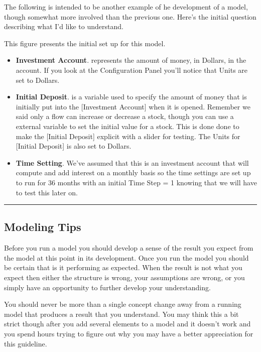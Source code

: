 \documentclass[]{memoir}
\begin{document}
The following is intended to be another example of he development of a
model, though somewhat more involved than the previous one. Here's the
initial question describing what I'd like to understand.

This figure presents the initial set up for this model.

\begin{itemize}
\itemsep1pt\parskip0pt
\item
  \textbf{Investment Account}. represents the amount of money, in
  Dollars, in the account. If you look at the Configuration Panel you'll
  notice that Units are set to Dollars.
\item
  \textbf{Initial Deposit}. is a variable used to specify the amount of
  money that is initially put into the {[}Investment Account{]} when it
  is opened. Remember we said only a flow can increase or decrease a
  stock, though you can use a external variable to set the initial value
  for a stock. This is done done to make the {[}Initial Deposit{]}
  explicit with a slider for testing. The Units for {[}Initial
  Deposit{]} is also set to Dollars.
\item
  \textbf{Time Setting}. We've assumed that this is an investment
  account that will compute and add interest on a monthly basis so the
  time settings are set up to run for 36 months with an initial Time
  Step = 1 knowing that we will have to test this later on.
\end{itemize}

\begin{center}\rule{3in}{0.4pt}\end{center}

\subsection{Modeling Tips}

Before you run a model you should develop a sense of the result you
expect from the model at this point in its development. Once you run the
model you should be certain that is it performing as expected. When the
result is not what you expect then either the structure is wrong, your
assumptions are wrong, or you simply have an opportunity to further
develop your understanding.

You should never be more than a single concept change away from a
running model that produces a result that you understand. You may think
this a bit strict though after you add several elements to a model and
it doesn't work and you spend hours trying to figure out why you may
have a better appreciation for this guideline.
\end{document}
